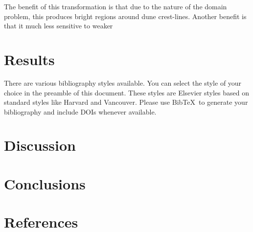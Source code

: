 \documentclass[review]{elsarticle}
\begin{document}
 The benefit of this transformation is that due to the nature of the domain problem, this produces bright regions around dune crest-lines. Another benefit is that it much less sensitive to weaker  


\section{Results}
\label{sec:results}

There are various bibliography styles available. You can select the style of your choice in the preamble of this document. These styles are Elsevier styles based on standard styles like Harvard and Vancouver. Please use Bib\TeX\ to generate your bibliography and include DOIs whenever available.

\section{Discussion}
\label{sec:discussion}

\section{Conclusions}

\section*{References}


\end{document}
